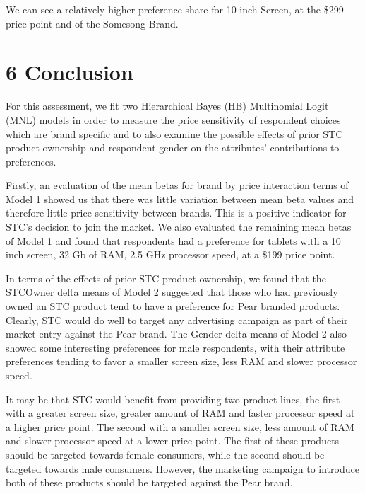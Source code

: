 \documentclass[]{article}
\begin{document}
We can see a relatively higher preference share for 10 inch Screen, at
the \$299 price point and of the Somesong Brand.

\section{6 Conclusion}\label{conclusion}

For this assessment, we fit two Hierarchical Bayes (HB) Multinomial
Logit (MNL) models in order to measure the price sensitivity of
respondent choices which are brand specific and to also examine the
possible effects of prior STC product ownership and respondent gender on
the attributes' contributions to preferences.

Firstly, an evaluation of the mean betas for brand by price interaction
terms of Model 1 showed us that there was little variation between mean
beta values and therefore little price sensitivity between brands. This
is a positive indicator for STC's decision to join the market. We also
evaluated the remaining mean betas of Model 1 and found that respondents
had a preference for tablets with a 10 inch screen, 32 Gb of RAM, 2.5
GHz processor speed, at a \$199 price point.

In terms of the effects of prior STC product ownership, we found that
the STCOwner delta means of Model 2 suggested that those who had
previously owned an STC product tend to have a preference for Pear
branded products. Clearly, STC would do well to target any advertising
campaign as part of their market entry against the Pear brand. The
Gender delta means of Model 2 also showed some interesting preferences
for male respondents, with their attribute preferences tending to favor
a smaller screen size, less RAM and slower processor speed.

It may be that STC would benefit from providing two product lines, the
first with a greater screen size, greater amount of RAM and faster
processor speed at a higher price point. The second with a smaller
screen size, less amount of RAM and slower processor speed at a lower
price point. The first of these products should be targeted towards
female consumers, while the second should be targeted towards male
consumers. However, the marketing campaign to introduce both of these
products should be targeted against the Pear brand.

\hypertarget{refs}{}
\end{document}
